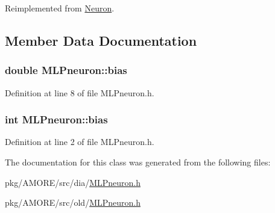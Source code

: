 Reimplemented from \hyperlink{class_neuron_a95327aa80a9ec949491f214a0c159b5a}{Neuron}.



\subsection{Member Data Documentation}
\hypertarget{class_m_l_pneuron_abdc23c40177d863755a18b4ac6053461}{
\subsubsection[{bias}]{\setlength{\rightskip}{0pt plus 5cm}double {\bf MLPneuron::bias}}}
\label{class_m_l_pneuron_abdc23c40177d863755a18b4ac6053461}


Definition at line 8 of file MLPneuron.h.

\hypertarget{class_m_l_pneuron_a6f8cb5b2fbf48db003ea8a413ffdbd8b}{
\subsubsection[{bias}]{\setlength{\rightskip}{0pt plus 5cm}int {\bf MLPneuron::bias}}}
\label{class_m_l_pneuron_a6f8cb5b2fbf48db003ea8a413ffdbd8b}


Definition at line 2 of file MLPneuron.h.



The documentation for this class was generated from the following files:\begin{DoxyCompactItemize}
\item 
pkg/AMORE/src/dia/\hyperlink{dia_2_m_l_pneuron_8h}{MLPneuron.h}\item 
pkg/AMORE/src/old/\hyperlink{old_2_m_l_pneuron_8h}{MLPneuron.h}\end{DoxyCompactItemize}
